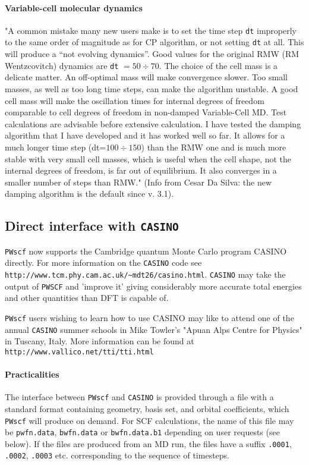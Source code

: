 \documentclass[12pt,a4paper]{article}
\begin{document}
\paragraph{Variable-cell molecular dynamics}

"A common mistake many new users make is to set the time step \texttt{dt}
improperly to the same order of magnitude as for CP algorithm, or
not setting \texttt{dt} at all. This will produce a ``not evolving dynamics''.
Good values for the original RMW (RM Wentzcovitch) dynamics are 
\texttt{dt} $ = 50 \div 70$. The choice of the cell mass is a delicate matter. An
off-optimal mass will make convergence slower. Too small masses, as
well as too long time steps, can make the algorithm unstable. A good
cell mass will make the oscillation times for internal degrees of
freedom comparable to cell degrees of freedom in non-damped
Variable-Cell MD. Test calculations are advisable before extensive
calculation. I have tested the damping algorithm that I have developed
and it has worked well so far. It allows for a much longer time step
(dt=$100 \div 150$) than the RMW one and is much more stable with very
small cell masses, which is useful when the cell shape, not the
internal degrees of freedom, is far out of equilibrium. It also
converges in a smaller number of steps than RMW." (Info from Cesar Da
Silva: the new damping algorithm is the default since v. 3.1).

\subsection{Direct interface with \texttt{CASINO}} \label{pw2casino_info}

\texttt{PWscf} now supports the Cambridge quantum Monte Carlo program CASINO directly. For more information
on the \texttt{CASINO} code see \texttt{http://www.tcm.phy.cam.ac.uk/\~{}mdt26/casino.html}. 
\texttt{CASINO} may take the output of \texttt{PWSCF} and
'improve it' giving considerably more accurate total energies and other
quantities than DFT is capable of.


\texttt{PWscf} users wishing to learn how to use CASINO may like to attend one
of the annual \texttt{CASINO} summer schools in Mike Towler's "Apuan Alps Centre
for Physics" in Tuscany, Italy. More information can be found at \texttt{http://www.vallico.net/tti/tti.html} 
\paragraph{Practicalities}
The interface between \texttt{PWscf} and \texttt{CASINO} is provided through a file with a
standard format containing geometry, basis set, and orbital coefficients, which
\texttt{PWscf} will produce on demand. For SCF calculations, the name of this file may
be \texttt{pwfn.data}, \texttt{bwfn.data} or \texttt{bwfn.data.b1} depending on user requests (see below).
If the files are produced from an MD run, the files have a suffix \texttt{.0001}, \texttt{.0002},
\texttt{.0003} etc.  corresponding to the sequence of timesteps.
\end{document}

